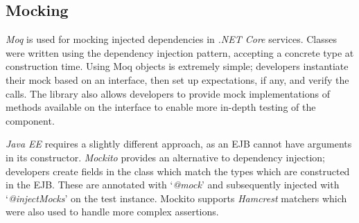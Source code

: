 \subsection{Mocking}
\par
\textit{Moq}\cite{Moq} is used for mocking injected dependencies in \textit{.NET Core} services. Classes were written using the dependency injection pattern, accepting a concrete type at construction time. Using Moq objects is extremely simple; developers instantiate their mock based on an interface, then set up expectations, if any, and verify the calls.  The library also allows developers to provide mock implementations of methods available on the interface to enable more in-depth testing of the component.

\par
\textit{Java EE} requires a slightly different approach, as an EJB cannot have arguments in its constructor. \textit{Mockito}\cite{Mockito} provides an alternative to dependency injection; developers create fields in the class which match the types which are constructed in the EJB. These are annotated with `\textit{@mock}' and subsequently injected with `\textit{@injectMocks}' on the test instance. Mockito supports \textit{Hamcrest}\cite{Hamcrest} matchers which were also used to handle more complex assertions.
